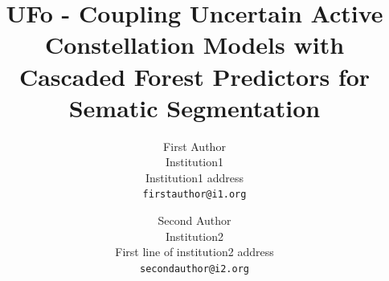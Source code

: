 \documentclass[10pt,twocolumn,letterpaper]{article}
\begin{document}
\title{UFo - Coupling Uncertain Active Constellation Models with \\
Cascaded Forest Predictors for Sematic Segmentation}

\author{First Author\\
Institution1\\
Institution1 address\\
{\tt\small firstauthor@i1.org}
\and
Second Author\\
Institution2\\
First line of institution2 address\\
{\tt\small secondauthor@i2.org}
}

\maketitle
\end{document}

